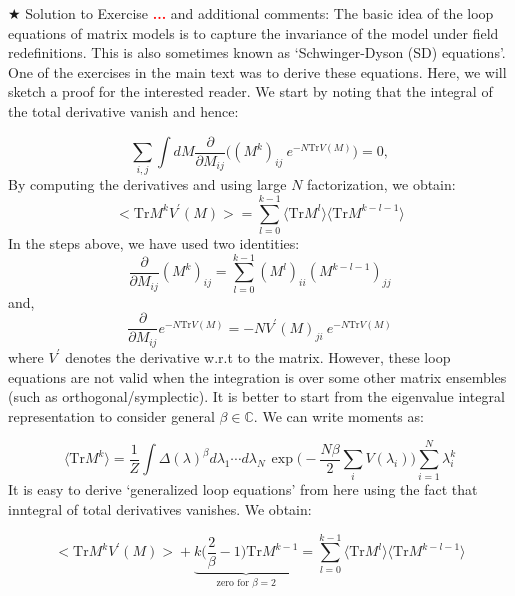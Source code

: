 \documentclass[11pt]{article}
\newcommand{\TODO}[1]{\textcolor{red}{{\bf #1}}}
\begin{document}
\noindent $\bigstar$ Solution to Exercise \TODO{...} and additional comments: 
The basic idea of the loop equations of matrix models is to capture the invariance of the model under field redefinitions. This is also sometimes known as `Schwinger-Dyson (SD) equations'. One of the exercises in the main text was to derive these equations. Here, we will sketch a proof for the interested reader. We start by noting that the integral of the total derivative vanish and hence:

\begin{equation}
	\sum_{i,j} \int dM \frac{\partial}{\partial M_{ij}} \Bigg( (M^k)_{ij}~e^{-N\mathrm{Tr} V(M)}\Bigg) = 0, 
\end{equation}
By computing the derivatives and using large $N$ factorization, we obtain:
\begin{equation}
	\Big< \mathrm{Tr} M^{k} V^{\prime}(M) \Big> = \sum_{l=0}^{k-1} \langle \mathrm{Tr} M^{l} \rangle  \langle \mathrm{Tr} M^{k-l-1} \rangle
\end{equation}
In the steps above, we have used two identities:
\begin{equation}
	\frac{\partial}{\partial M_{ij}} (M^{k})_{ij} = \sum_{l=0}^{k-1} (M^{l})_{ii} (M^{k-l-1})_{jj}
\end{equation}
and, 
\begin{equation}
	\frac{\partial}{\partial M_{ij}} e^{-N\mathrm{Tr} V(M)} = -N V^{\prime}(M)_{ji}~e^{-N\mathrm{Tr} V(M)}
\end{equation}
where $V^{\prime}$ denotes the derivative w.r.t to the matrix. 
However, these loop equations are not valid when the integration is over some other matrix ensembles (such as orthogonal/symplectic). It is better to start from the eigenvalue integral representation to consider general $\beta \in \mathbb{C}$. We can write moments as:

\begin{equation} 
\langle \mbox{Tr} M^k  \rangle = \frac{1}{Z} \int \Delta(\lambda)^{\beta} 
	d\lambda_1 \cdots d\lambda_{N~} \exp\Bigg(-\frac{N\beta}{2} \sum_{i} V(\lambda_{i})\Bigg)  \sum_{i=1}^{N} \lambda_{i}^k
\end{equation}
It is easy to derive `generalized loop equations' from here using the fact that inntegral of total derivatives vanishes. We obtain:

\begin{equation}
		\Big< \mathrm{Tr} M^{k} V^{\prime}(M) \Big> +  \underbrace{k \Bigg(\frac{2}{\beta} - 1 \Bigg) \mathrm{Tr} M^{k-1}}_{\text{zero for $\beta=2$}} = \sum_{l=0}^{k-1} \langle \mathrm{Tr} M^{l} \rangle  \langle \mathrm{Tr} M^{k-l-1} \rangle
\end{equation}
 
\end{document}

